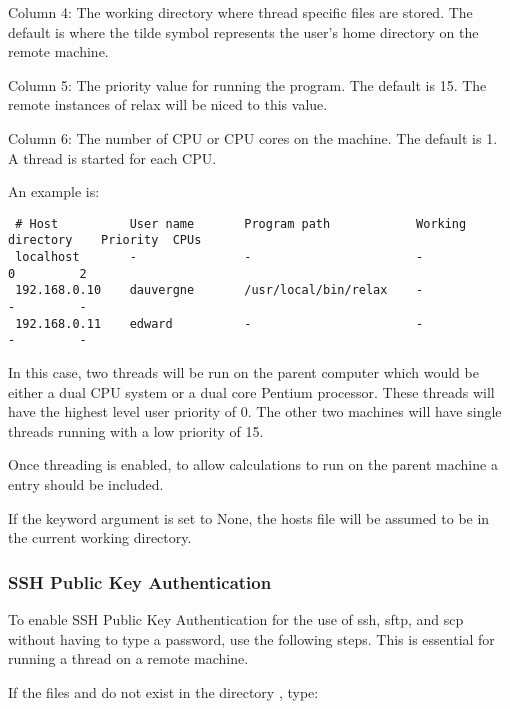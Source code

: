  Column 4:  The working directory where thread specific files are stored.  The default is  where the tilde \quotecmd{\~{}} symbol represents the user's home directory on the remote machine. 
  

 Column 5:  The priority value for running the program.  The default is 15.  The remote instances of relax will be niced to this value. 
  

 Column 6:  The number of CPU or CPU cores on the machine.  The default is 1.  A thread is started for each CPU. 
  

 An example is: 
  

 {\footnotesize \begin{verbatim} 
 # Host          User name       Program path            Working directory    Priority  CPUs 
 localhost       -               -                       -                    0         2 
 192.168.0.10    dauvergne       /usr/local/bin/relax    -                    -         - 
 192.168.0.11    edward          -                       -                    -         - 
 \end{verbatim}} 

 In this case, two threads will be run on the parent computer which would be either a dual CPU system or a dual core  Pentium processor.  These threads will have the highest level user priority of 0.  The other two machines will have single threads running with a low priority of 15. 
  

 Once threading is enabled, to allow calculations to run on the parent machine a  entry should be included. 
  

 If the keyword argument  is set to None, the hosts file will be assumed to be in the current working directory. 
  

  
 \subsubsection{SSH Public Key Authentication} 

 To enable SSH Public Key Authentication for the use of ssh, sftp, and scp without having to type a password, use the following steps.  This is essential for running a thread on a remote machine. 
  

 If the files  and  do not exist in the directory , type: 
  



